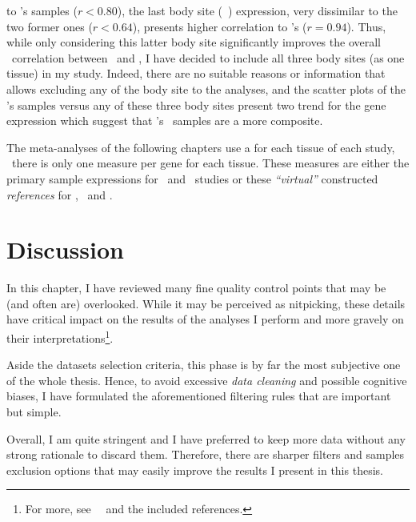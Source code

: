 \begin{itemize}[topsep=0pt,nosep]
            to \uhlen{}'s  samples ($r < 0.80$),
            the last body site (\ie\ ) expression,
            very dissimilar to the two former ones ($r < 0.64$),
            presents higher correlation to \uhlen's ($r = 0.94$).
            Thus, while only considering this latter body site significantly improves
            the overall \oesophagus\ correlation between \gtex\ and \uhlen,
            I have decided to include all three body sites (as one tissue)
            in my study.
            Indeed, there are no suitable reasons or information that allows excluding
            any of the body site  to the analyses,
            and the scatter plots of the \uhlen{}'s samples versus any of these three body
            sites present two trend for the gene expression which suggest that
            \uhlen{}'s \oesophagus\ samples are a more composite.

\end{itemize}

\label{def:trep}
The meta-analyses of the following chapters use
a  for each tissue of each study, \ie\
there is only one measure per gene for each tissue.
These measures are either
the primary sample expressions for \castle\ and \ibm\ studies or
these \emph{\enquote{virtual}} constructed \emph{references}
for \brawand, \uhlen\ and \gtex.



\section{Discussion}

In this chapter, I have reviewed many fine quality control points that
may be (and often are) overlooked.
While it may be perceived as nitpicking,
these details have critical impact on the results of the analyses
I perform and more gravely on their interpretations\footnote{%
For more, see~~
and the included references.}.

Aside the datasets selection criteria,
this phase is by far the most subjective one of the whole thesis.
Hence, to avoid excessive \emph{data cleaning}
and possible cognitive biases,
I have formulated the aforementioned filtering rules
that are important but simple.

Overall, I am quite stringent and I have preferred to keep more data
without any strong rationale to discard them.
Therefore, there are sharper filters and samples exclusion options that
may easily improve the results I present in this thesis.


